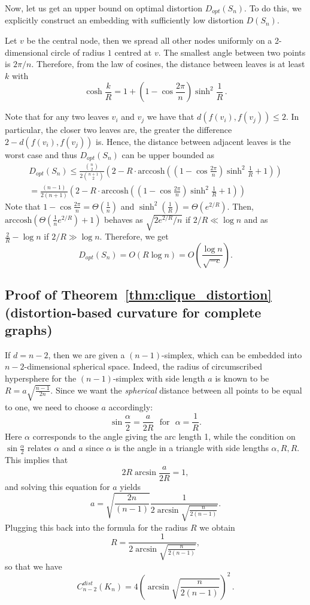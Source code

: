 \documentclass{article} %
\begin{document}
Now, let us get an upper bound on optimal distortion $D_{opt}(S_n)$. To do this, we explicitly construct an embedding with sufficiently low distortion $D(S_n)$.

Let $v$ be the central node, then we spread all other nodes uniformly on a 2-dimensional circle of radius $1$ centred at $v$. The smallest angle between two points is $2 \pi / n$. Therefore, from the law of cosines, the distance between leaves is at least $k$ with
\[
\cosh \frac{k}{R} = 1  + \left(1 -  \cos \frac{2 \pi}{n}\right)  \sinh^2 \frac{1}{R} \,.
\]

Note that for any two leaves $v_i$ and $v_j$ we have that $d(f(v_i), f(v_j)) \le 2$. In particular, the closer two leaves are, the greater the difference $2 - d(f(v_i), f(v_j))$ is. Hence, the distance between adjacent leaves is the worst case and thus $D_{opt}(S_n)$ can be upper bounded as
\begin{multline*}
D_{opt}(S_n) \le \frac{{n \choose 2}}{2{n+1\choose 2}} \left(2 - R\cdot \mathrm{arccosh}\left( \left(1 - \cos \frac{2 \pi}{n}\right)\sinh^2\frac{1}{R}  + 1 \right)\right) \\
= \frac{(n-1)}{2(n+1)} \left(2 - R\cdot \mathrm{arccosh}\left( \left(1 - \cos \frac{2 \pi}{n}\right)\sinh^2\frac{1}{R}  + 1 \right)\right)
\end{multline*}
Note that $1 - \cos\frac{2\pi}{n} = \Theta\left(\frac{1}{n}\right)$ and $\sinh^2\left(\frac{1}{R}\right) = \Theta\left(e^{2/R}\right)$.
Then, $\textrm{arccosh}\left(\Theta\left(\frac{1}{n} e^{2/R}\right) + 1 \right)$ behaves as $\sqrt{2e^{2/R}/n}$ if $2/R \ll \log n$ and as $\frac{2}{R} - \log n$ if $2/R \gg \log n$.
Therefore, we get
\[
D_{opt}(S_n) = O\left( R \log n \right) = O\left( \frac{\log n}{\sqrt{-c}} \right).
\]

\subsection{Proof of Theorem~\ref{thm:clique_distortion} (distortion-based curvature for complete graphs)}\label{app:clique_distortion}

If $d = n-2$, then we are given a $(n-1)$-simplex, which can be embedded into $n-2$-dimensional spherical space. Indeed, the radius of circumscribed hypersphere for the $(n-1)$-simplex with side length $a$ is known to be $R = a\sqrt{\frac{n-1}{2n}}$. Since we want the \textit{spherical} distance between all points to be equal to one, we need to choose $a$ accordingly:
\[
\sin \frac{\alpha}{2} = \frac{a}{2R} \,\,\text{ for } \,\,\alpha = \frac{1}{R}.
\]
Here $\alpha$ corresponds to the angle giving the arc length 1, while the condition on $\sin \frac{\alpha}{2}$ relates $\alpha$ and $a$ since $\alpha$ is the angle in a triangle with side lengths $\alpha, R, R$.
This implies that
\[
2 R \arcsin \frac{a}{2R} = 1,
\]
and solving this equation for $a$ yields
\[
a  = \sqrt{\frac{2n}{(n-1)}}\frac{1}{2\arcsin \sqrt{\frac{n}{2(n-1)}}}.
\]
Plugging this back into the formula for the radius $R$ we obtain
\[
R = \frac{1}{2\arcsin \sqrt{\frac{n}{2(n-1)}}},
\]
so that we have
\[
C_{n-2}^{dist}(K_n) = 4 \left(\arcsin \sqrt{\frac{n}{2(n-1)}}\right)^2\,.
\]
\end{document}
